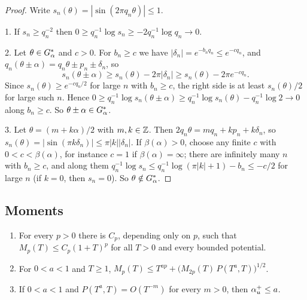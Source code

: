 \begin{proof}
Write $s_n(\theta)=|\sin(2\pi q_n\theta)|\le1$.

1. If $s_n\ge q_n^{-2}$ then $0\ge q_n^{-1}\log s_n\ge-2q_n^{-1}\log q_n\to0$.

2. Let $\theta\in G_\alpha^*$ and $c>0$. For $b_n\ge c$ we have $|\delta_n|=e^{-b_nq_n}\le e^{-cq_n}$, and $q_n(\theta\pm\alpha)=q_n\theta\pm p_n\pm\delta_n$, so
\[
s_n(\theta\pm\alpha)\ge s_n(\theta)-2\pi|\delta_n|\ge s_n(\theta)-2\pi e^{-cq_n}.
\]
Since $s_n(\theta)\ge e^{-cq_n/2}$ for large $n$ with $b_n\ge c$, the right side is at least $s_n(\theta)/2$ for large such $n$. Hence $0\ge q_n^{-1}\log s_n(\theta\pm\alpha)\ge q_n^{-1}\log s_n(\theta)-q_n^{-1}\log2\to0$ along $b_n\ge c$. So $\theta\pm\alpha\in G_\alpha^*$.

3. Let $\theta=(m+k\alpha)/2$ with $m,k\in\mathbb Z$. Then $2q_n\theta=mq_n+kp_n+k\delta_n$, so $s_n(\theta)=|\sin(\pi k\delta_n)|\le\pi|k||\delta_n|$. If $\beta(\alpha)>0$, choose any finite $c$ with $0<c<\beta(\alpha)$, for instance $c=1$ if $\beta(\alpha)=\infty$; there are infinitely many $n$ with $b_n\ge c$, and along them $q_n^{-1}\log s_n\le q_n^{-1}\log(\pi|k|+1)-b_n\le-c/2$ for large $n$ (if $k=0$, then $s_n=0$). So $\theta\notin G_\alpha^*$.
\end{proof}


\subsection{Moments}

\begin{lemma}\label{lem:moments}
\begin{enumerate}
\item For every $p>0$ there is $C_p$, depending only on $p$, such that $M_p(T)\le C_p(1+T)^p$ for all $T>0$ and every bounded potential.
\item For $0<a<1$ and $T\ge1$, $M_p(T)\le T^{ap}+\bigl(M_{2p}(T)\,P(T^a,T)\bigr)^{1/2}$.
\item If $0<a<1$ and $P(T^a,T)=O(T^{-m})$ for every $m>0$, then $\alpha_u^+\le a$.
\end{enumerate}
\end{lemma}

